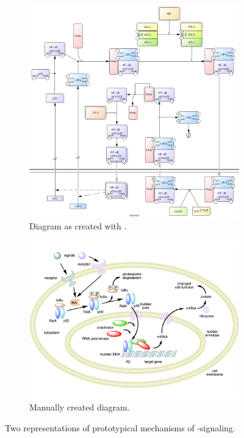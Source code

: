 \documentclass[
	fontsize=10pt, %
	twoside=false, %
	secnumdepth=1, %
]{kaobook}
\begin{document}
\begin{figure}[b]
  \centering
  \begin{subfigure}{0.4\textwidth}
    \centering
    \includegraphics[width=\textwidth]{NF-kB-mechanism/CellDesigner.png}
    \caption{Diagram as created with \celldesigner.}
    \label{fig:process-diagram-old-vs-new:celldesigner}
  \end{subfigure}
  \hspace{1em}
  \begin{subfigure}{0.4\textwidth}
    \centering
    \includegraphics[width=\textwidth]{NF-kB-mechanism/handdrawn.png}
    \caption{Manually created diagram.}
    \label{fig:process-diagram-old-vs-new:handdrawn}
  \end{subfigure}
  \caption{
    Two representations of prototypical mechanisms of \nfkb-signaling.
  }
  \label{fig:process-diagram-old-vs-new}
\end{figure}
\end{document}
